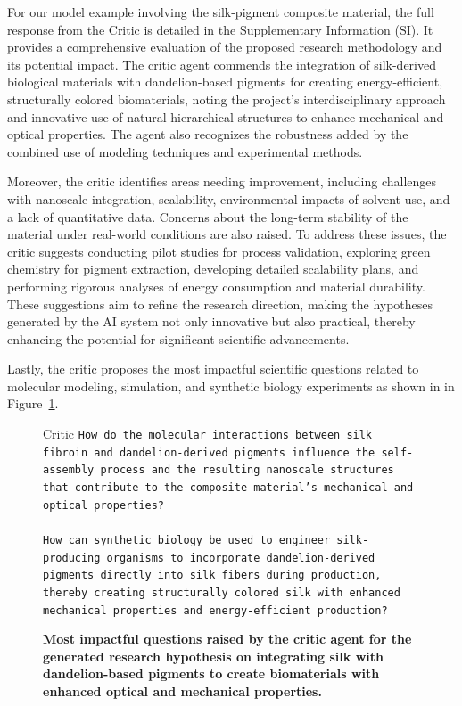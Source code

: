 \documentclass{article}
\begin{document}
For our model example involving the silk-pigment composite material, the full response from the Critic is detailed in the Supplementary Information (SI). It provides a comprehensive evaluation of the proposed research methodology and its potential impact. The critic agent commends the integration of silk-derived biological materials with dandelion-based pigments for creating energy-efficient, structurally colored biomaterials, noting the project's interdisciplinary approach and innovative use of natural hierarchical structures to enhance mechanical and optical properties. The agent also recognizes the robustness added by the combined use of modeling techniques and experimental methods.

Moreover, the critic identifies areas needing improvement, including challenges with nanoscale integration, scalability, environmental impacts of solvent use, and a lack of quantitative data. Concerns about the long-term stability of the material under real-world conditions are also raised. To address these issues, the critic suggests conducting pilot studies for process validation, exploring green chemistry for pigment extraction, developing detailed scalability plans, and performing rigorous analyses of energy consumption and material durability. These suggestions aim to refine the research direction, making the hypotheses generated by the AI system not only innovative but also practical, thereby enhancing the potential for significant scientific advancements.

Lastly, the critic proposes the most impactful scientific questions related to molecular modeling, simulation, and synthetic biology experiments as shown in in Figure~\ref{fig:critic}.

\begin{figure}[h]
    \centering
\begin{Box1}[colbacktitle={white!90!white}, colback={black!3!white}]{Critic}
\footnotesize{\texttt{How do the molecular interactions between silk fibroin and dandelion-derived pigments influence the self-assembly process and the resulting nanoscale structures that
contribute to the composite material's mechanical and optical properties?}}
\\
\\
\footnotesize{\texttt{How can synthetic biology be used to engineer silk-producing organisms to incorporate dandelion-derived pigments directly into silk fibers during production, thereby
creating structurally colored silk with enhanced mechanical properties and energy-efficient production?}}
\end{Box1}
    \caption{\textbf{Most impactful questions raised by the critic agent for the generated research hypothesis on integrating silk with dandelion-based pigments to create biomaterials with enhanced optical and mechanical properties.}}
    \label{fig:critic}
\end{figure}
\end{document}
